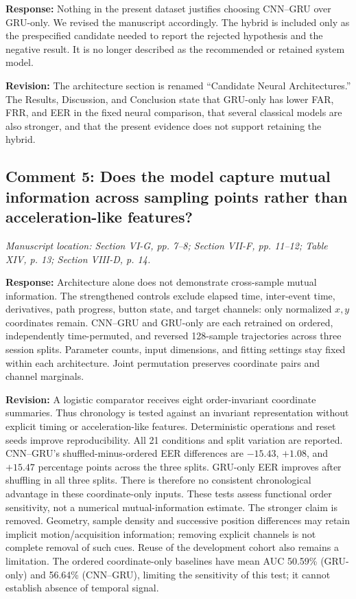 \documentclass[11pt]{article}
\newcommand{\response}[1]{\par\noindent\textcolor{responseblue}{\textbf{Response:}} #1\par}
\newcommand{\change}[1]{\par\noindent\textcolor{responseblue}{\textbf{Revision:}} #1\par}
\newcommand{\location}[1]{\par\noindent\textit{Manuscript location: #1.}\par}
\begin{document}
\response{Nothing in the present dataset justifies choosing CNN--GRU over
GRU-only. We revised the manuscript accordingly. The hybrid is included only
as the prespecified candidate needed to report the rejected hypothesis and the
negative result. It is no longer described as the recommended or retained
system model.}

\change{The architecture section is renamed ``Candidate Neural
Architectures.'' The Results, Discussion, and Conclusion state that GRU-only
has lower FAR, FRR, and EER in the fixed neural comparison, that several
classical models are also stronger, and that the present evidence does not
support retaining the hybrid.}

\subsection*{Comment 5: Does the model capture mutual information across sampling points rather than acceleration-like features?}
\location{Section VI-G, pp. 7--8; Section VII-F, pp. 11--12; Table XIV, p. 13; Section VIII-D, p. 14}

\response{Architecture alone does not demonstrate cross-sample mutual
information. The strengthened controls exclude elapsed time, inter-event time,
derivatives, path progress, button state, and target channels: only normalized
$x,y$ coordinates remain. CNN--GRU and GRU-only are each retrained on ordered,
independently time-permuted, and reversed 128-sample trajectories across three
session splits. Parameter counts, input dimensions, and fitting settings stay
fixed within each architecture. Joint permutation preserves coordinate pairs
and channel marginals.}

\change{A logistic comparator receives eight order-invariant coordinate
summaries. Thus chronology is tested against an invariant representation
without explicit timing or acceleration-like features. Deterministic operations
and reset seeds improve reproducibility. All 21 conditions and split variation
are reported. CNN--GRU's shuffled-minus-ordered EER differences are
$-15.43$, $+1.08$, and $+15.47$ percentage points across the three splits.
GRU-only EER improves after shuffling in all three splits. There is therefore
no consistent chronological advantage in these coordinate-only inputs. These
tests assess functional order sensitivity, not a numerical mutual-information
estimate. The stronger claim is removed. Geometry, sample density and successive
position differences may retain implicit motion/acquisition information;
removing explicit channels is not complete removal of such cues. Reuse of
the development cohort also remains a limitation. The ordered coordinate-only
baselines have mean AUC 50.59\% (GRU-only) and 56.64\% (CNN--GRU), limiting
the sensitivity of this test; it cannot establish absence of temporal signal.}
\end{document}
